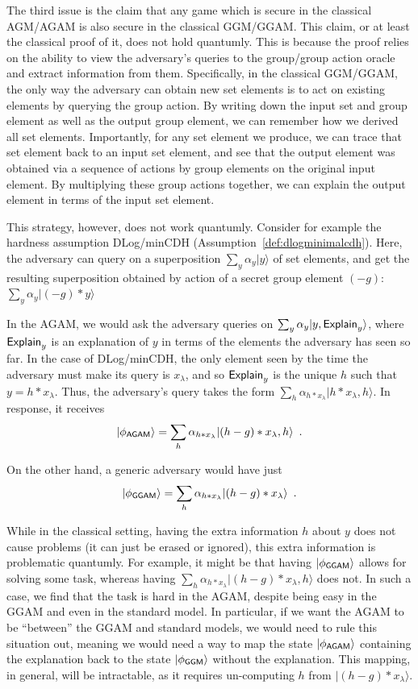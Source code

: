 \documentclass{article}\usepackage[a4paper,margin=20mm]{geometry}
\numberwithin{theorem}{section}
\numberwithin{equation}{section}
\begin{document}
The third issue is the claim that any game which is secure in the classical AGM/AGAM is also secure in the classical GGM/GGAM. This claim, or at least the classical proof of it, does not hold quantumly. This is because the proof relies on the ability to view the adversary's queries to the group/group action oracle and extract information from them. Specifically, in the classical GGM/GGAM, the only way the adversary can obtain new set elements is to act on existing elements by querying the group action. By writing down the input set and group element as well as the output group element, we can remember how we derived all set elements. Importantly, for any set element we produce, we can trace that set element back to an input set element, and see that the output element was obtained via a sequence of actions by group elements on the original input element. By multiplying these group actions together, we can explain the output element in terms of the input set element.

This strategy, however, does not work quantumly. Consider for example the hardness assumption DLog/minCDH (Assumption~\ref{def:dlogminimalcdh}). Here, the adversary can query on a superposition $\sum_y \alpha_y |y\rangle$ of set elements, and get the resulting superposition obtained by action of a secret group element $(-g)$: $\sum_y \alpha_y |(-g)*y\rangle$

In the AGAM, we would ask the adversary queries on $\sum_y \alpha_y |y,{\sf Explain}_y\rangle$, where ${\sf Explain}_y$ is an explanation of $y$ in terms of the elements the adversary has seen so far. In the case of DLog/minCDH, the only element seen by the time the adversary must make its query is $x_\lambda$, and so ${\sf Explain}_y$ is the unique $h$ such that $y=h*x_\lambda$. Thus, the adversary's query takes the form $\sum_h \alpha_{h*x_\lambda} |h*x_\lambda,h\rangle$. In response, it receives \[|\phi_{\sf AGAM}\rangle=\sum_h \alpha_{h*x_\lambda} |(h-g)*x_\lambda,h\rangle\enspace .\]

On the other hand, a generic adversary would have just \[|\phi_{\sf GGAM}\rangle=\sum_h \alpha_{h*x_\lambda} |(h-g)*x_\lambda\rangle\enspace .\]

While in the classical setting, having the extra information $h$ about $y$ does not cause problems (it can just be erased or ignored), this extra information is problematic quantumly. For example, it might be that having $|\phi_{\sf GGAM}\rangle$ allows for solving some task, whereas having $\sum_h \alpha_{h*x_\lambda} |(h-g)*x_\lambda,h\rangle$ does not. In such a case, we find that the task is hard in the AGAM, despite being easy in the GGAM and even in the standard model. In particular, if we want the AGAM to be ``between'' the GGAM and standard models, we would need to rule this situation out, meaning we would need a way to map the state $|\phi_{\sf AGAM}\rangle$ containing the explanation back to the state $|\phi_{\sf GGM}\rangle$ without the explanation. This mapping, in general, will be intractable, as it requires un-computing $h$ from $|(h-g)*x_\lambda\rangle$. 
\end{document}
